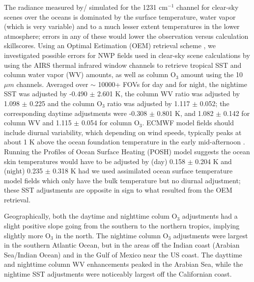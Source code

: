 \documentclass[agupp]{aguplus}              %
\newcommand{\wn}{cm$^{-1}$\xspace}
\newcommand{\um}{$\mu m$\xspace}
\newcommand{\ozone}{O$_3$\xspace}
\begin{document}
\begin{article}
The radiance measured by/ simulated for the 1231 \wn channel for
clear-sky scenes over the oceans is dominated by the surface
temperature, water vapor (which is very variable) and to a much lesser
extent temperatures in the lower atmosphere; errors in any of these
would lower the observation versus calculation skillscores.  Using an
Optimal Estimation (OEM) retrieval scheme \citep{rod:00}, we
investigated possible errors for NWP fields used in clear-sky scene
calculations by using the AIRS thermal infrared window channels to
retrieve tropical SST and column water vapor (WV) amounts, as well as column
\ozone amount using the 10\um channels. Averaged over $\sim$
10000+ FOVs for day and for night, the nightime SST was adjusted by
-0.490 $\pm$ 2.601 K, the column WV ratio was adjusted by 1.098 $\pm$
0.225 and the column \ozone ratio was adjusted by 1.117 $\pm$ 0.052; the
corresponding daytime adjustments were -0.308 $\pm$ 0.801 K, and 1.082
$\pm$ 0.142 for column WV and 1.115 $\pm$ 0.054 for column \ozone. ECMWF model
fields should include diurnal variability, which depending on wind
speeds, typically peaks at about 1 K above the ocean foundation
temperature in the early mid-afternoon \citep{gen:09}. Running the
Profiles of Ocean Surface Heating (POSH) model \citep{gen:09} suggests
the ocean skin temperatures would have to be adjusted by (day) 0.158
$\pm$ 0.204 K and (night) 0.235 $\pm$ 0.318 K had we used assimilated
ocean surface temperature model fields which only have the bulk
temperature but no diurnal adjustment; these SST adjustments are
opposite in sign to what resulted from the OEM retrieval.

Geographically, both the daytime and nighttime colum \ozone
adjustments had a slight positive slope going from the southern to the
northern tropics, implying slightly more \ozone in the north.  The
nightime column \ozone adjustments were largest in the southern
Atlantic Ocean, but in the areas off the Indian coast (Arabian
Sea/Indian Ocean) and in the Gulf of Mexico near the US coast. The
dayttime and nighttime column WV enhancements peaked in the Arabian
Sea, while the nightime SST adjustments were noticeably largest off
the Californian coast.


\end{article}
\end{document}
